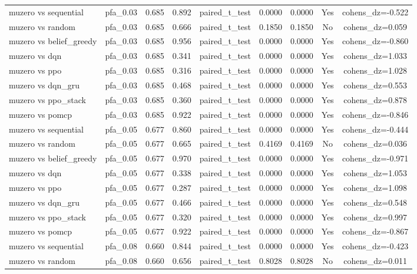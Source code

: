\begin{table}[htbp]
\begin{tabular}{lcccccccc}
muzero vs sequential & pfa_0.03 & 0.685 & 0.892 & paired_t_test & 0.0000 & 0.0000 & Yes & cohens_dz=-0.522 \\
muzero vs random & pfa_0.03 & 0.685 & 0.666 & paired_t_test & 0.1850 & 0.1850 & No & cohens_dz=0.059 \\
muzero vs belief_greedy & pfa_0.03 & 0.685 & 0.956 & paired_t_test & 0.0000 & 0.0000 & Yes & cohens_dz=-0.860 \\
muzero vs dqn & pfa_0.03 & 0.685 & 0.341 & paired_t_test & 0.0000 & 0.0000 & Yes & cohens_dz=1.033 \\
muzero vs ppo & pfa_0.03 & 0.685 & 0.316 & paired_t_test & 0.0000 & 0.0000 & Yes & cohens_dz=1.028 \\
muzero vs dqn_gru & pfa_0.03 & 0.685 & 0.468 & paired_t_test & 0.0000 & 0.0000 & Yes & cohens_dz=0.553 \\
muzero vs ppo_stack & pfa_0.03 & 0.685 & 0.360 & paired_t_test & 0.0000 & 0.0000 & Yes & cohens_dz=0.878 \\
muzero vs pomcp & pfa_0.03 & 0.685 & 0.922 & paired_t_test & 0.0000 & 0.0000 & Yes & cohens_dz=-0.846 \\
muzero vs sequential & pfa_0.05 & 0.677 & 0.860 & paired_t_test & 0.0000 & 0.0000 & Yes & cohens_dz=-0.444 \\
muzero vs random & pfa_0.05 & 0.677 & 0.665 & paired_t_test & 0.4169 & 0.4169 & No & cohens_dz=0.036 \\
muzero vs belief_greedy & pfa_0.05 & 0.677 & 0.970 & paired_t_test & 0.0000 & 0.0000 & Yes & cohens_dz=-0.971 \\
muzero vs dqn & pfa_0.05 & 0.677 & 0.338 & paired_t_test & 0.0000 & 0.0000 & Yes & cohens_dz=1.053 \\
muzero vs ppo & pfa_0.05 & 0.677 & 0.287 & paired_t_test & 0.0000 & 0.0000 & Yes & cohens_dz=1.098 \\
muzero vs dqn_gru & pfa_0.05 & 0.677 & 0.466 & paired_t_test & 0.0000 & 0.0000 & Yes & cohens_dz=0.548 \\
muzero vs ppo_stack & pfa_0.05 & 0.677 & 0.320 & paired_t_test & 0.0000 & 0.0000 & Yes & cohens_dz=0.997 \\
muzero vs pomcp & pfa_0.05 & 0.677 & 0.922 & paired_t_test & 0.0000 & 0.0000 & Yes & cohens_dz=-0.867 \\
muzero vs sequential & pfa_0.08 & 0.660 & 0.844 & paired_t_test & 0.0000 & 0.0000 & Yes & cohens_dz=-0.423 \\
muzero vs random & pfa_0.08 & 0.660 & 0.656 & paired_t_test & 0.8028 & 0.8028 & No & cohens_dz=0.011 \\

\end{tabular}
\end{table}
